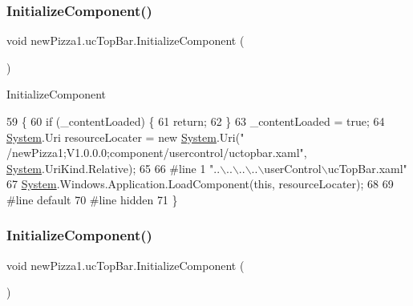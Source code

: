 \subsubsection{\texorpdfstring{Initialize\+Component()}{InitializeComponent()}\hspace{0.1cm}{\footnotesize\ttfamily [1/6]}}
{\footnotesize\ttfamily void new\+Pizza1.\+uc\+Top\+Bar.\+Initialize\+Component (\begin{DoxyParamCaption}{ }\end{DoxyParamCaption})\hspace{0.3cm}{\ttfamily [inline]}}



Initialize\+Component 


\begin{DoxyCode}
59                                           \{
60             \textcolor{keywordflow}{if} (\_contentLoaded) \{
61                 \textcolor{keywordflow}{return};
62             \}
63             \_contentLoaded = \textcolor{keyword}{true};
64             \hyperlink{namespaceSystem}{System}.Uri resourceLocater = \textcolor{keyword}{new} \hyperlink{namespaceSystem}{System}.Uri(\textcolor{stringliteral}{"
      /newPizza1;V1.0.0.0;component/usercontrol/uctopbar.xaml"}, \hyperlink{namespaceSystem}{System}.UriKind.Relative);
65             
66 \textcolor{preprocessor}{            #line 1 "..\(\backslash\)..\(\backslash\)..\(\backslash\)..\(\backslash\)userControl\(\backslash\)ucTopBar.xaml"
}
67             \hyperlink{namespaceSystem}{System}.Windows.Application.LoadComponent(\textcolor{keyword}{this}, resourceLocater);
68             
69 \textcolor{preprocessor}{            #line default
}
70 \textcolor{preprocessor}{            #line hidden
}
71         \}
\end{DoxyCode}
\mbox{\label{classnewPizza1_1_1ucTopBar_a667aed93b177538819f27c62e5e88844}} 
\subsubsection{\texorpdfstring{Initialize\+Component()}{InitializeComponent()}\hspace{0.1cm}{\footnotesize\ttfamily [2/6]}}
{\footnotesize\ttfamily void new\+Pizza1.\+uc\+Top\+Bar.\+Initialize\+Component (\begin{DoxyParamCaption}{ }\end{DoxyParamCaption})\hspace{0.3cm}{\ttfamily [inline]}}



